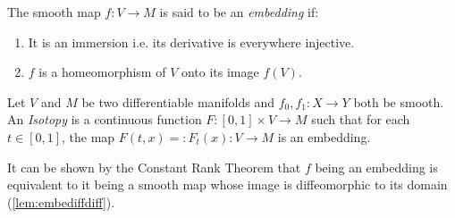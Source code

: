 \begin{definition}[Embedding]
The smooth map $f:V\to M$ is said to be an \emph{embedding} if:
\begin{enumerate}
    \item It is an immersion i.e. its derivative is everywhere injective.
    \item $f$ is a homeomorphism of $V$ onto its image $f(V)$.
\end{enumerate}
\end{definition}

\begin{definition}[Isotopy]\label{def:isotopy}
 Let $V$ and $M$ be two differentiable manifolds and $f_0, f_1 : X\to Y$ both be smooth. An \emph{Isotopy} is a continuous function $F: [0,1]\times V \to M$ such that for each $t\in [0,1]$, the map $F(t,x) =: F_t(x):V\to M$ is an embedding.
\end{definition}

\begin{remark}\label{remark:embediffdiff}
It can be shown by the Constant Rank Theorem that $f$ being an embedding is equivalent to it being a smooth map whose image is diffeomorphic to its domain (\ref{lem:embediffdiff}).
\end{remark}

